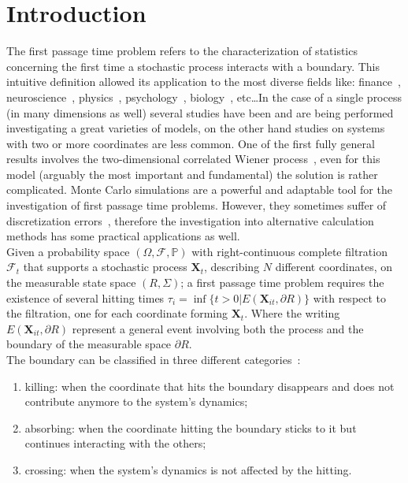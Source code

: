 \documentclass[a4paper,11pt]{amsart}
\theoremstyle{remark}
\begin{document}
\section{Introduction}
The first passage time problem refers to the characterization of statistics concerning the first time a stochastic process interacts with a boundary. This intuitive definition allowed its application to the most diverse fields like: finance~\cite{brigo_interest_2006,glasserman_monte_2010}, neuroscience~\cite{bachar_stochastic_2013}, physics~\cite{redner_guide_2007, bray_persistence_2013}, psychology~\cite{navarro_fast_2009}, biology~\cite{lawley_distribution_2020}, etc\ldots In the case of a single process (in many dimensions as well) several studies have been and are being performed investigating a great varieties of models, on the other hand studies on systems with two or more coordinates are less common. One of the first fully general results involves the two-dimensional correlated Wiener process~\cite{domine_first_1993, kou_first-passage_2016, sacerdote_first_2016}, even for this model (arguably the most important and fundamental) the solution is rather complicated. Monte Carlo simulations are a powerful and adaptable tool for the investigation of first passage time problems. However, they sometimes suffer of discretization errors~\cite{kloeden_numerical_1992}, therefore the investigation into alternative calculation methods has some practical applications as well.\\
Given a probability space $(\Omega,\mathcal{F},\mathbb{P})$ with right-continuous complete filtration $\mathcal{F}_t$ that supports a stochastic process $\mathbf{X}_t$, describing $N$ different coordinates, on the measurable state space $(R,\Sigma)$; a first passage time problem requires the existence of several hitting times  $\tau_i=\inf\{t>0 | E(\mathbf{X}_{it},\partial R)\}$ with respect to the filtration, one for each coordinate forming $\mathbf{X}_t$. Where the writing $E(\mathbf{X}_{it},\partial R)$ represent a general event involving both the process and the boundary of the measurable space $\partial R$.\\
The boundary can be classified in three different categories~\cite{sacerdote_first_2016}:
\begin{enumerate}
\item killing: when the coordinate that hits the boundary disappears and does not contribute anymore to the system's dynamics;
\item absorbing: when the coordinate hitting the boundary sticks to it but continues interacting with the others;
\item crossing: when the system's dynamics is not affected by the hitting.
\end{enumerate}
\end{document}
